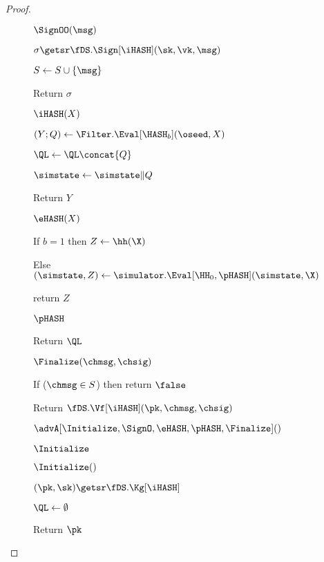 \begin{proof}
\begin{figure}[t]
{			\begin{oracle}{$\SignOO(\msg)$}
				\item $\sigma \getsr \fDS.\Sign[\iHASH](\sk, \vk, \msg)$
				\item $S \gets S \cup \{\msg\}$
				\item Return $\sigma$
			\end{oracle}
			\ExptSepSpace
			
			\begin{oracle}{$\iHASH(X)$}
				\item $(Y;Q) \gets \Filter.\Eval[\HASH_b](\oseed,X)$
				\item $\QL \gets \QL \concat \{Q\}$
				\item $\simstate\gets\simstate\|Q$  
				\item Return $Y$
			\end{oracle}
			\ExptSepSpace
			
			\begin{oracle}{$\eHASH(X)$}
			\item If $b=1$ then  $Z\gets \hh(\X)$ 
			\item Else $(\simstate,Z) \gets \simulator.\Eval[\HH_0, \pHASH] (\simstate,\X)$ 
			\item return $Z$
			\end{oracle}
			\ExptSepSpace
			
			\begin{oracle}{$\pHASH$}
				\item Return $\QL$
			\end{oracle}
			\ExptSepSpace
			
			\begin{oracle}{$\Finalize(\chmsg, \chsig)$}
				\item If ($\chmsg\in S$) then return $\false$
				\item Return $\fDS.\Vf[\iHASH](\pk, \chmsg, \chsig)$ \vspace{2pt}
			\end{oracle}
		}{
		\ExptSepSpace
		\begin{oracle}{}
			\item $\advA[\Initialize,\SignO,\eHASH,\pHASH,\Finalize]()$
		\end{oracle}
	\ExptSepSpace
	\begin{oracle}{$\Initialize$}
		\item $\Initialize()$ 
		\item $(\pk, \sk) \getsr \fDS.\Kg[\iHASH]$
		\item $\QL \gets \emptyset$
		\item Return $\pk$
	\end{oracle}
	\ExptSepSpace
	
}
\end{figure}
\end{proof}

